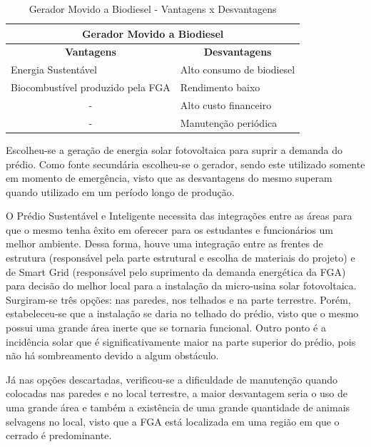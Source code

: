 \begin{table}[h]
  \centering
  \caption{Gerador Movido a Biodiesel - Vantagens x Desvantagens}
  \label{table_biodiesel}
  \begin{tabular}{|c|l|}
    \hline
    \multicolumn{2}{|c|}{\textbf{Gerador Movido a Biodiesel}}                                            \\ \hline
    \textbf{Vantagens}                                      & \multicolumn{1}{c|}{\textbf{Desvantagens}} \\ \hline
    \multicolumn{1}{|l|}{Energia Sustentável}               & Alto consumo de biodiesel                  \\ \hline
    \multicolumn{1}{|l|}{Biocombustível produzido pela FGA} & Rendimento baixo                           \\ \hline
    -                                                       & Alto custo financeiro                      \\ \hline
    -                                                       & Manutenção periódica                       \\ \hline
  \end{tabular}
\end{table}

Escolheu-se a geração de energia solar fotovoltaica para suprir a demanda do prédio. Como fonte secundária escolheu-se o gerador, sendo este utilizado somente em momento de emergência, visto que as desvantagens do mesmo superam quando utilizado em um período longo de produção.

O Prédio Sustentável e Inteligente necessita das integrações entre as áreas para que o mesmo tenha êxito em oferecer para os estudantes e funcionários um melhor ambiente. Dessa forma, houve uma integração entre as frentes de estrutura (responsável pela parte estrutural e escolha de materiais do projeto) e de Smart Grid (responsável pelo suprimento da demanda energética da FGA) para decisão do melhor local para a instalação da micro-usina solar fotovoltaica. Surgiram-se três opções: nas paredes, nos telhados e na parte terrestre. Porém, estabeleceu-se que a instalação se daria no telhado do prédio, visto que o mesmo possui uma grande área inerte que se tornaria funcional. Outro ponto é a incidência solar que é significativamente maior na parte superior do prédio, pois não há sombreamento devido a algum obstáculo.

Já nas opções descartadas, verificou-se a dificuldade de manutenção quando colocadas nas paredes e no local terrestre, a maior desvantagem seria o uso de uma grande área e também a existência  de uma grande quantidade de animais selvagens no local, visto que a FGA está localizada em uma região em que o cerrado é predominante.

